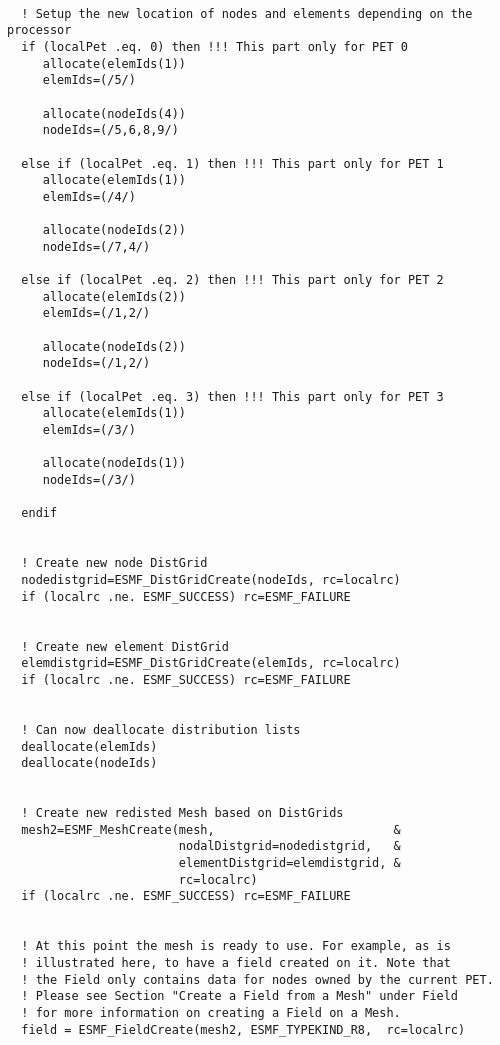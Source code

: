 
 \begin{verbatim}

  ! Setup the new location of nodes and elements depending on the processor
  if (localPet .eq. 0) then !!! This part only for PET 0
     allocate(elemIds(1))
     elemIds=(/5/)
     
     allocate(nodeIds(4))
     nodeIds=(/5,6,8,9/)
     
  else if (localPet .eq. 1) then !!! This part only for PET 1
     allocate(elemIds(1))
     elemIds=(/4/)
     
     allocate(nodeIds(2))
     nodeIds=(/7,4/)        
     
  else if (localPet .eq. 2) then !!! This part only for PET 2
     allocate(elemIds(2))
     elemIds=(/1,2/)
     
     allocate(nodeIds(2))
     nodeIds=(/1,2/)
     
  else if (localPet .eq. 3) then !!! This part only for PET 3
     allocate(elemIds(1))
     elemIds=(/3/)
     
     allocate(nodeIds(1))
     nodeIds=(/3/)
     
  endif


  ! Create new node DistGrid
  nodedistgrid=ESMF_DistGridCreate(nodeIds, rc=localrc)
  if (localrc .ne. ESMF_SUCCESS) rc=ESMF_FAILURE

 
  ! Create new element DistGrid
  elemdistgrid=ESMF_DistGridCreate(elemIds, rc=localrc)
  if (localrc .ne. ESMF_SUCCESS) rc=ESMF_FAILURE


  ! Can now deallocate distribution lists
  deallocate(elemIds)
  deallocate(nodeIds)


  ! Create new redisted Mesh based on DistGrids
  mesh2=ESMF_MeshCreate(mesh,                         &
                        nodalDistgrid=nodedistgrid,   & 
                        elementDistgrid=elemdistgrid, &
                        rc=localrc)
  if (localrc .ne. ESMF_SUCCESS) rc=ESMF_FAILURE


  ! At this point the mesh is ready to use. For example, as is 
  ! illustrated here, to have a field created on it. Note that 
  ! the Field only contains data for nodes owned by the current PET.
  ! Please see Section "Create a Field from a Mesh" under Field
  ! for more information on creating a Field on a Mesh. 
  field = ESMF_FieldCreate(mesh2, ESMF_TYPEKIND_R8,  rc=localrc)

 
\end{verbatim}
 
